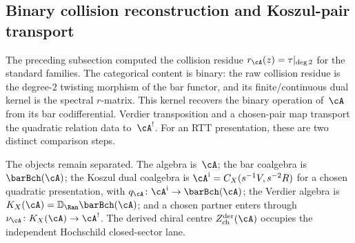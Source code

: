 
\subsection{Binary collision reconstruction and Koszul-pair transport}
\label{subsec:r-matrix-koszul-dual-inverse}

The preceding subsection computed the collision residue
$r_\cA(z) = \tau|_{\deg 2}$ for the standard families. The
categorical content is binary: the raw collision residue is the
degree-$2$ twisting morphism of the bar functor, and its
finite/continuous dual kernel is the spectral $r$-matrix. This
kernel recovers the binary operation of~$\cA$ from its bar
codifferential. Verdier transposition and a chosen-pair map transport
the quadratic relation data to~$\cA^!$. For an RTT presentation,
these are two distinct comparison steps.

The objects remain separated. The algebra is~$\cA$; the bar
coalgebra is $\barBch(\cA)$; the Koszul dual coalgebra is
$\cA^{\mathrm i}=C_X(s^{-1}V,s^{-2}R)$ for a chosen quadratic presentation,
with $q_\cA\colon\cA^{\mathrm i}\to\barBch(\cA)$; the Verdier algebra
is $K_X(\cA)=\mathbb D_{\Ran}\barBch(\cA)$; and a chosen partner enters
through $\nu_\cA\colon K_X(\cA)\to\cA^!$. The derived chiral centre
$Z^{\mathrm{der}}_{\mathrm{ch}}(\cA)$ occupies the independent
Hochschild closed-sector lane.

